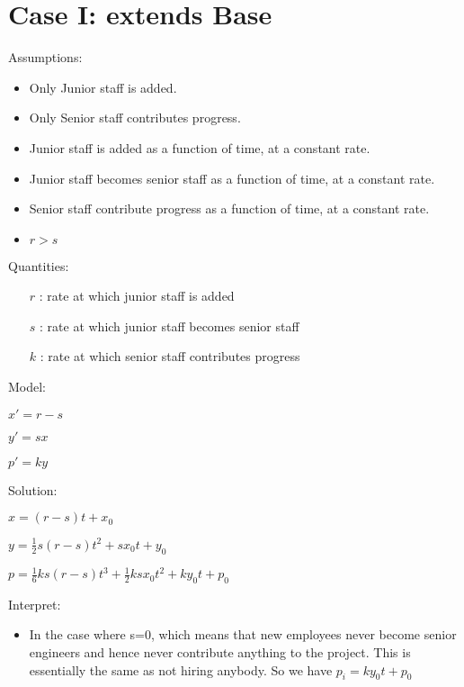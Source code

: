 \documentclass{article}
\newenvironment{atomize}
    {\begin{list} {} {
            \setlength\itemindent{0pt}
            \setlength\leftmargin{10pt}
            \setlength\labelwidth{0pt}
    }}
    {\end{list}}
\begin{document}
\section*{Case I: extends Base}
    \begin{atomize}
        \item Assumptions:
            \begin{itemize}
                \item Only Junior staff is added.
                \item Only Senior staff contributes progress.
								\item Junior staff is added as a function of time, at a constant
								rate.
								\item Junior staff becomes senior staff as a function of time,
								at a constant rate.
								\item Senior staff contribute progress as a function of time, at
								a constant rate.
                \item $r > s$
            \end{itemize}
        \item Quantities:
            \begin{itemize}
                \item [$r$]: rate at which junior staff is added
                \item [$s$]: rate at which junior staff becomes senior staff
                \item [$k$]: rate at which senior staff contributes progress
            \end{itemize}
        \item Model:
            \begin{atomize}
                \item $x\prime = r - s$
                \item $y\prime = sx$
                \item $p\prime = ky$
            \end{atomize}
        \item Solution:
            \begin{atomize}
                \item $x = \left(r - s\right)t + x_{0}$
                \item $y = \frac{1}{2}s\left(r - s\right)t^{2} + sx_{0}t+y_{0}$
								\item $p = \frac{1}{6}ks(r-s)t^{3} + \frac{1}{2}ksx_{0}t^{2} +
								ky_{0}t + p_{0}$
            \end{atomize}
        \item Interpret:
            \begin{itemize}
								\item In the case where s=0, which means that new employees
								never become senior engineers and hence never contribute
								anything to the project. This is essentially the same as not
								hiring anybody. So we have $p_{i}=ky_{0}t + p_{0}$


\end{itemize}
\end{atomize}
\end{document}
